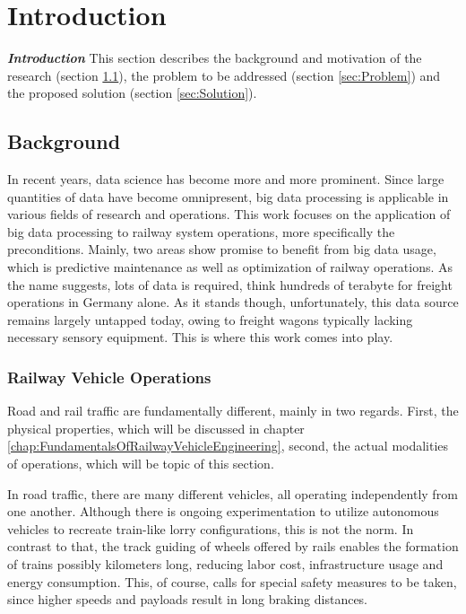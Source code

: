 \chapter{Introduction}
\label{chap:Introduction}
\par\noindent
\textit{\textbf{Introduction}} This section describes the background and motivation of the research (section \ref{sec:Background}), the problem to be addressed (section \ref{sec:Problem}) and the proposed solution (section \ref{sec:Solution}).

\section{Background}
\label{sec:Background}
\par\noindent
In recent years, data science has become more and more prominent. Since large quantities of data have become omnipresent, big data processing is applicable in various fields of research and operations. This work focuses on the application of big data processing to railway system operations, more specifically the preconditions. Mainly, two areas show promise to benefit from big data usage, which is predictive maintenance as well as optimization of railway operations. As the name suggests, lots of data is required, think hundreds of terabyte for freight operations in Germany alone. As it stands though, unfortunately, this data source remains largely untapped today, owing to freight wagons typically lacking necessary sensory equipment. This is where this work comes into play.

\subsection{Railway Vehicle Operations}
\label{sec:RailwayVehicleOperations}
\par\noindent
Road and rail traffic are fundamentally different, mainly in two regards. First, the physical properties, which will be discussed in chapter \ref{chap:FundamentalsOfRailwayVehicleEngineering}, second, the actual modalities of operations, which will be topic of this section.
\par
In road traffic, there are many different vehicles, all operating independently from one another. Although there is ongoing experimentation to utilize autonomous vehicles to recreate train-like lorry configurations, this is not the norm. In contrast to that, the track guiding of wheels offered by rails enables the formation of trains possibly kilometers long, reducing labor cost, infrastructure usage and energy consumption. This, of course, calls for special safety measures to be taken, since higher speeds and payloads result in long braking distances. 

